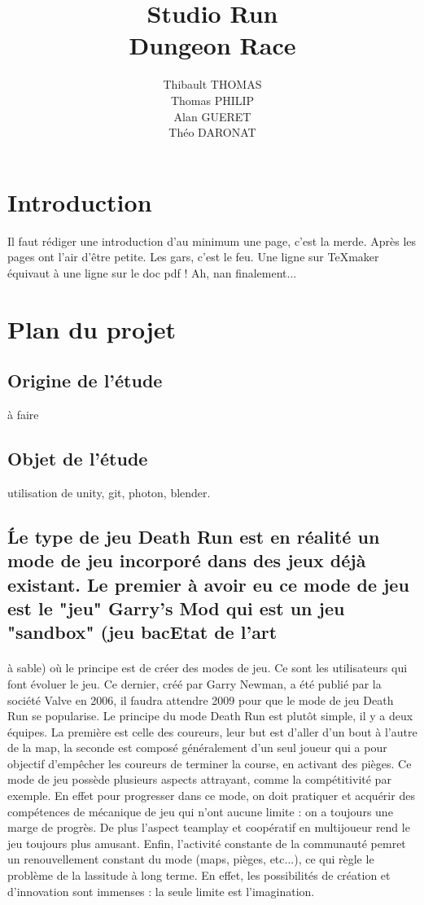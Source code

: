 \documentclass[12pt]{report}
\title{\large Studio Run \\ \normalsize Dungeon Race}
\date{}
\author{Thibault THOMAS \\ Thomas PHILIP \\ Alan GUERET \\ Théo DARONAT}
\begin{document}
\maketitle
\tableofcontents
\section{Introduction}
Il faut rédiger une introduction d'au minimum une page, c'est la merde. Après les pages ont l'air d'être petite. Les gars, c'est le feu. Une ligne sur TeXmaker équivaut à une ligne sur le doc pdf ! Ah, nan finalement...
\section{Plan du projet}
	\subsection{Origine de l'étude}
	à faire
	\subsection{Objet de l'étude}
		utilisation de unity, git, photon, blender.
	\subsection{\'
	Le type de jeu Death Run est en réalité un mode de jeu incorporé dans des jeux déjà existant. Le premier à avoir eu ce mode de jeu est le "jeu" Garry's Mod qui est un jeu "sandbox" (jeu bacEtat de l'art}	
	\paragraph{} à sable) où le principe est de créer des modes de jeu. Ce sont les utilisateurs qui font évoluer le jeu. Ce dernier, créé par Garry Newman, a été publié par la société Valve en 2006, il faudra attendre 2009 pour que le mode de jeu Death Run se popularise. Le principe du mode Death Run est plutôt simple, il y a deux équipes. La première est celle des coureurs, leur but est d'aller d'un bout à l'autre de la map, la seconde est composé généralement d'un seul joueur qui a pour objectif d'empêcher les coureurs de terminer la course, en activant des pièges. Ce mode de jeu possède plusieurs aspects attrayant, comme la compétitivité par exemple. En effet pour progresser dans ce mode, on doit pratiquer et acquérir des compétences de mécanique de jeu qui n'ont aucune limite : on a toujours une marge de progrès. De plus l'aspect teamplay et coopératif en multijoueur rend le jeu toujours plus amusant. Enfin, l'activité constante de la communauté pemret un renouvellement constant du mode (maps, pièges, etc...), ce qui règle le problème de la lassitude à long terme. En effet, les possibilités de création et d'innovation sont immenses : la seule limite est l'imagination.
\end{document}
